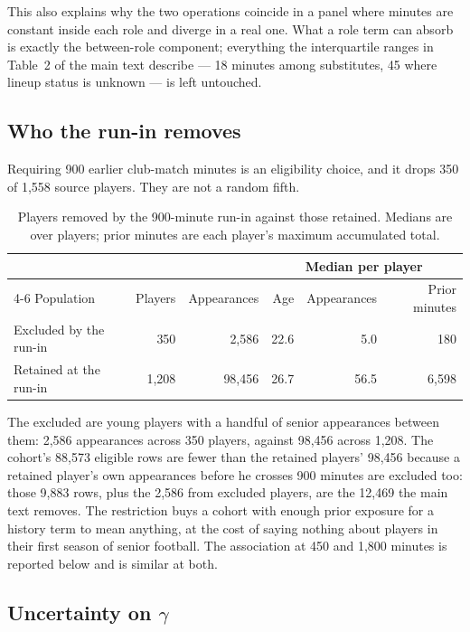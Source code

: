 \documentclass[11pt]{article}
\begin{document}
This also explains why the two operations coincide in a panel where minutes are constant inside each role and diverge in a real one. What a role term can absorb is exactly the between-role component; everything the interquartile ranges in Table~2 of the main text describe --- 18 minutes among substitutes, 45 where lineup status is unknown --- is left untouched.

\subsection*{Who the run-in removes}

Requiring 900 earlier club-match minutes is an eligibility choice, and it drops 350 of 1,558 source players. They are not a random fifth.

\begin{table}[h]
\centering
\caption{Players removed by the 900-minute run-in against those retained. Medians are over players; prior minutes are each player's maximum accumulated total.}
\label{tab:supp_run_in}
\small
\setlength{\tabcolsep}{4pt}
\begin{tabular}{lrrrrr}
\toprule
 & & & \multicolumn{3}{c}{Median per player}\\
\cmidrule(l){4-6}
Population & Players & Appearances & Age & Appearances & Prior minutes\\
\midrule
Excluded by the run-in & 350 & 2,586 & 22.6 & 5.0 & 180\\
Retained at the run-in & 1,208 & 98,456 & 26.7 & 56.5 & 6,598\\
\bottomrule
\end{tabular}
\end{table}

The excluded are young players with a handful of senior appearances between them: 2,586 appearances across 350 players, against 98,456 across 1,208. The cohort's 88,573 eligible rows are fewer than the retained players' 98,456 because a retained player's own appearances before he crosses 900 minutes are excluded too: those 9,883 rows, plus the 2,586 from excluded players, are the 12,469 the main text removes. The restriction buys a cohort with enough prior exposure for a history term to mean anything, at the cost of saying nothing about players in their first season of senior football. The association at 450 and 1,800 minutes is reported below and is similar at both.

\subsection*{Uncertainty on $\gamma$}
\end{document}
